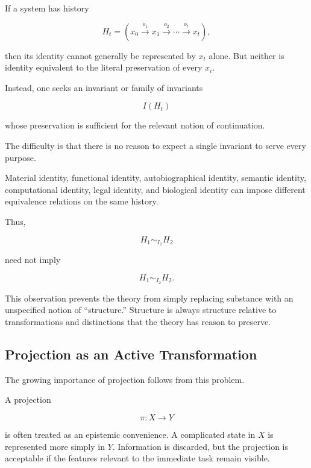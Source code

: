 \documentclass[11pt]{article}
\theoremstyle{remark}
\begin{document}
If a system has history

\begin{equation}
H_t
=
(x_0
\xrightarrow{o_1}
x_1
\xrightarrow{o_2}
\cdots
\xrightarrow{o_t}
x_t),
\end{equation}

then its identity cannot generally be represented by $x_t$ alone. But neither is identity equivalent to the literal preservation of every $x_i$.

Instead, one seeks an invariant or family of invariants

\begin{equation}
I(H_t)
\end{equation}

whose preservation is sufficient for the relevant notion of continuation.

The difficulty is that there is no reason to expect a single invariant to serve every purpose.

Material identity, functional identity, autobiographical identity, semantic identity, computational identity, legal identity, and biological identity can impose different equivalence relations on the same history.

Thus,

\begin{equation}
H_1\sim_{I_1}H_2
\end{equation}

need not imply

\begin{equation}
H_1\sim_{I_2}H_2.
\end{equation}

This observation prevents the theory from simply replacing substance with an unspecified notion of ``structure.'' Structure is always structure relative to transformations and distinctions that the theory has reason to preserve.

\subsection{Projection as an Active Transformation}

The growing importance of projection follows from this problem.

A projection

\begin{equation}
\pi:X\rightarrow Y
\end{equation}

is often treated as an epistemic convenience. A complicated state in $X$ is represented more simply in $Y$. Information is discarded, but the projection is acceptable if the features relevant to the immediate task remain visible.
\end{document}
